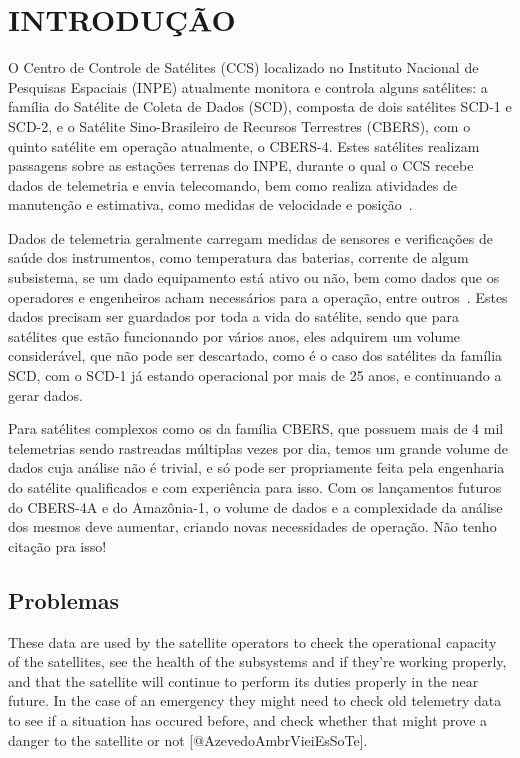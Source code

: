 
\chapter{INTRODUÇÃO}
\label{ch:intro}

O Centro de Controle de Satélites (CCS) localizado no Instituto Nacional de Pesquisas Espaciais (INPE) atualmente monitora e controla alguns satélites: a família do Satélite de Coleta de Dados (SCD), composta de dois satélites SCD-1 e SCD-2, e o Satélite Sino-Brasileiro de Recursos Terrestres (CBERS), com o quinto satélite em operação atualmente, o CBERS-4.
Estes satélites realizam passagens sobre as estações terrenas do INPE, durante o qual o CCS recebe dados de telemetria e envia telecomando, bem como realiza atividades de manutenção e estimativa, como medidas de velocidade e posição~\cite{AzevedoAmbr:2010:ArSaTe}.

Dados de telemetria geralmente carregam medidas de sensores e verificações de saúde dos instrumentos, como temperatura das baterias, corrente de algum subsistema, se um dado equipamento está ativo ou não, bem como dados que os operadores e engenheiros acham necessários para a operação, entre outros~\cite{AzevedoAmbr:2010:ArSaTe}.
Estes dados precisam ser guardados por toda a vida do satélite, sendo que para satélites que estão funcionando por vários anos, eles adquirem um volume considerável, que não pode ser descartado, como é o caso dos satélites da família SCD, com o SCD-1 já estando operacional por mais de 25 anos, e continuando a gerar dados.

Para satélites complexos como os da família CBERS, que possuem mais de 4 mil telemetrias sendo rastreadas múltiplas vezes por dia, temos um grande volume de dados cuja análise não é trivial, e só pode ser propriamente feita pela engenharia do satélite qualificados e com experiência para isso.
Com os lançamentos futuros do CBERS-4A e do Amazônia-1, o volume de dados e a complexidade da análise dos mesmos deve aumentar, criando novas necessidades de operação.  {\color{red} Não tenho citação pra isso!}

\section{Problemas}
These data are used by the satellite operators to check the operational capacity of the satellites, see the health of the subsystems and if they're working properly, and that the satellite will continue to perform its duties properly in the near future.
In the case of an emergency they might need to check old telemetry data to see if a situation has occured before, and check whether that might prove a danger to the satellite or not [@AzevedoAmbrVieiEsSoTe].

